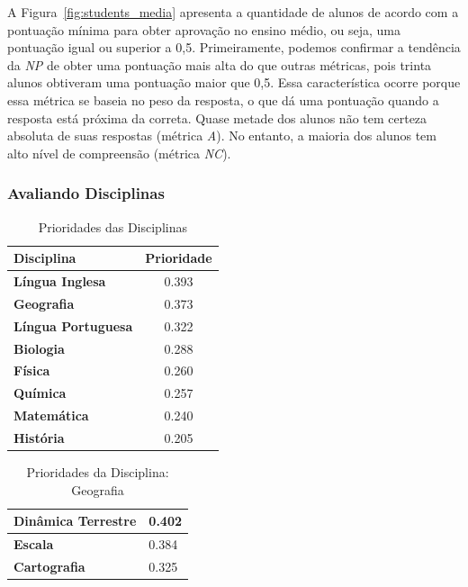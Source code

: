 A Figura~\ref{fig:students_media} apresenta a quantidade de alunos de acordo com a pontuação mínima para obter aprovação no ensino médio, ou seja, uma pontuação igual ou superior a 0,5. Primeiramente, podemos confirmar a tendência da \textit{NP} de obter uma pontuação mais alta do que outras métricas, pois trinta alunos obtiveram uma pontuação maior que 0,5. Essa característica ocorre porque essa métrica se baseia no peso da resposta, o que dá uma pontuação quando a resposta está próxima da correta.
%
Quase metade dos alunos não tem certeza absoluta de suas respostas (métrica \textit{A}). No entanto, a maioria dos alunos tem alto nível de compreensão (métrica \textit{NC}).

\subsubsection{Avaliando Disciplinas}

\begin{table}[htbp]
\caption{Prioridades das Disciplinas}
\centering
\begin{tabular}{|l|c|}
\hline
\textbf{Disciplina} & \textbf{Prioridade} \\ \hline
\textbf{Língua Inglesa} & 0.393 \\ \hline
\textbf{Geografia} & 0.373 \\ \hline
\textbf{Língua Portuguesa} & 0.322 \\ \hline
\textbf{Biologia} & 0.288 \\ \hline
\textbf{Física} & 0.260 \\ \hline
\textbf{Química} & 0.257 \\ \hline
\textbf{Matemática} & 0.240 \\ \hline
\textbf{História} & 0.205 \\ \hline
\end{tabular}
\label{tab:PrioritiesSubject}
\end{table}

\begin{table}[htbp]
\caption{Prioridades da Disciplina: Geografia}
\centering
\begin{tabular}{|l|l|}
\hline
\textbf{Dinâmica Terrestre} & 0.402 \\ \hline
\textbf{Escala} & 0.384 \\ \hline
\textbf{Cartografia} & 0.325 \\ \hline
\end{tabular}
\label{tab:PrioritiesBiology}
\end{table}

